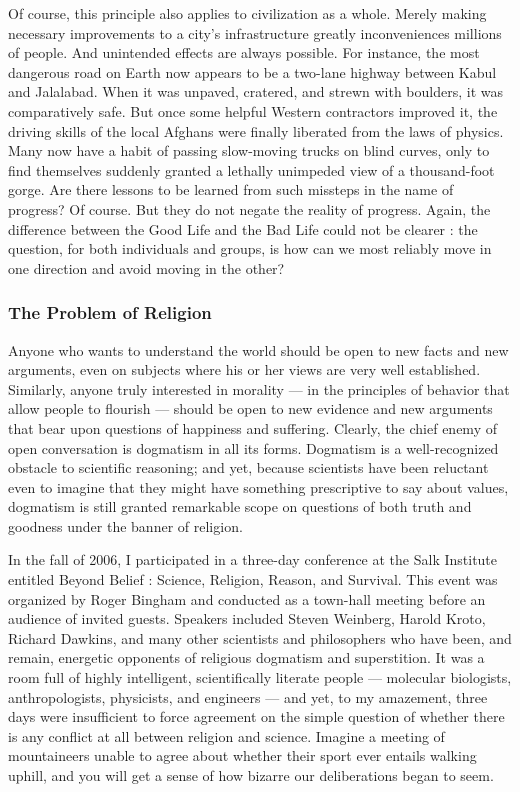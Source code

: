 \documentclass[a4paper,14pt]{extarticle}
\begin{document}
Of course, this principle also applies to civilization as a whole.
Merely making necessary improvements to a city's infrastructure greatly inconveniences millions of people.
And unintended effects are always possible.
For instance, the most dangerous road on Earth now appears to be a two-lane highway between Kabul and Jalalabad.
When it was unpaved, cratered, and strewn with boulders, it was comparatively safe.
But once some helpful Western contractors improved it, the driving skills of the local Afghans were finally liberated from the laws of physics.
Many now have a habit of passing slow-moving trucks on blind curves, only to find themselves suddenly granted a lethally unimpeded view of a thousand-foot gorge.
Are there lessons to be learned from such missteps in the name of progress?
Of course.
But they do not negate the reality of progress.
Again, the difference between the Good Life and the Bad Life could not be clearer :
the question, for both individuals and groups, is how can we most reliably move in one direction and avoid moving in the other?

\subsubsection{The Problem of Religion}

Anyone who wants to understand the world should be open to new facts and new arguments, even on subjects where his or her views are very well established.
Similarly, anyone truly interested in morality --- in the principles of behavior that allow people to flourish --- should be open to new evidence and new arguments that bear upon questions of happiness and suffering.
Clearly, the chief enemy of open conversation is dogmatism in all its forms.
Dogmatism is a well-recognized obstacle to scientific reasoning;
and yet, because scientists have been reluctant even to imagine that they might have something prescriptive to say about values, dogmatism is still granted remarkable scope on questions of both truth and goodness under the banner of religion.

In the fall of 2006, I participated in a three-day conference at the Salk Institute entitled Beyond Belief : Science, Religion, Reason, and Survival.
This event was organized by Roger Bingham and conducted as a town-hall meeting before an audience of invited guests.
Speakers included Steven Weinberg, Harold Kroto, Richard Dawkins, and many other scientists and philosophers who have been, and remain, energetic opponents of religious dogmatism and superstition.
It was a room full of highly intelligent, scientifically literate people --- molecular biologists, anthropologists, physicists, and engineers --- and yet, to my amazement, three days were insufficient to force agreement on the simple question of whether there is any conflict at all between religion and science.
Imagine a meeting of mountaineers unable to agree about whether their sport ever entails walking uphill, and you will get a sense of how bizarre our deliberations began to seem.
\end{document}
